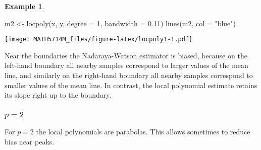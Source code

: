 \documentclass[
  a4paper,
]{article}
\newenvironment{Shaded}{\begin{snugshade}}{\end{snugshade}}
\newcommand{\AttributeTok}[1]{\textcolor[rgb]{0.77,0.63,0.00}{#1}}
\newcommand{\DecValTok}[1]{\textcolor[rgb]{0.00,0.00,0.81}{#1}}
\newcommand{\FloatTok}[1]{\textcolor[rgb]{0.00,0.00,0.81}{#1}}
\newcommand{\FunctionTok}[1]{\textcolor[rgb]{0.00,0.00,0.00}{#1}}
\newcommand{\NormalTok}[1]{#1}
\newcommand{\OtherTok}[1]{\textcolor[rgb]{0.56,0.35,0.01}{#1}}
\newcommand{\StringTok}[1]{\textcolor[rgb]{0.31,0.60,0.02}{#1}}
\theoremstyle{definition}
\theoremstyle{definition}
\newtheorem{example}{Example}[section]
\theoremstyle{definition}
\theoremstyle{definition}
\theoremstyle{remark}
\begin{document}
\begin{example}
\begin{Shaded}
\begin{Highlighting}[]
\NormalTok{m2 }\OtherTok{\textless{}{-}} \FunctionTok{locpoly}\NormalTok{(x, y, }\AttributeTok{degree =} \DecValTok{1}\NormalTok{, }\AttributeTok{bandwidth =} \FloatTok{0.11}\NormalTok{)}
\FunctionTok{lines}\NormalTok{(m2, }\AttributeTok{col =} \StringTok{"blue"}\NormalTok{)}
\end{Highlighting}
\end{Shaded}

\texttt{[image: MATH5714M\_files/figure-latex/locpoly1-1.pdf]}

Near the boundaries the Nadaraya-Watson estimator is biased, because on the
left-hand boundary all nearby samples correspond to larger values of the mean
line, and similarly on the right-hand boundary all nearby samples correspond to
smaller values of the mean line. In contrast, the local polynomial estimate
retains its slope right up to the boundary.
\end{example}

\hypertarget{p-2}{%
\subsubsection*{\texorpdfstring{\(p = 2\)}{p = 2}}\label{p-2}}

For \(p=2\) the local polynomials are parabolas. This allows sometimes to reduce
bias near peaks.
\end{document}
